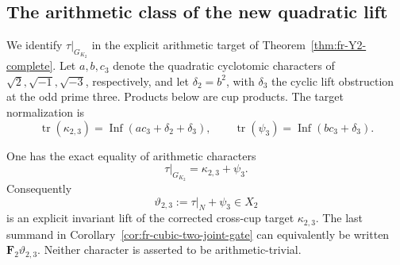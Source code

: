 \subsection{The arithmetic class of the new quadratic lift}

We identify \(\tau|_{G_{K_2}}\) in the explicit arithmetic target
of Theorem~\ref{thm:fr-Y2-complete}.
Let \(a,b,c_3\) denote the quadratic cyclotomic characters of
\(\sqrt2,\sqrt{-1},\sqrt{-3}\), respectively, and let
\(\delta_2=b^2\), with \(\delta_3\) the cyclic lift obstruction
at the odd prime three. Products below are cup products.
The target normalization is
\[
 \operatorname{tr}(\kappa_{2,3})
  =\operatorname{Inf}(a c_3+\delta_2+\delta_3),\qquad
 \operatorname{tr}(\psi_3)
  =\operatorname{Inf}(b c_3+\delta_3).
\]

\begin{proposition}\label{prop:fr-cubic-two-Y2-class}
One has the exact equality of arithmetic characters
\[
             \tau|_{G_{K_2}}=\kappa_{2,3}+\psi_3.
\]
Consequently
\[
                \vartheta_{2,3}:=\tau|_N+\psi_3\in X_2
\]
is an explicit invariant lift of the corrected cross-cup target
\(\kappa_{2,3}\).
The last summand in Corollary~\ref{cor:fr-cubic-two-joint-gate}
can equivalently be written \(\mathbf F_2\vartheta_{2,3}\).
Neither character is asserted to be arithmetic-trivial.
\end{proposition}

